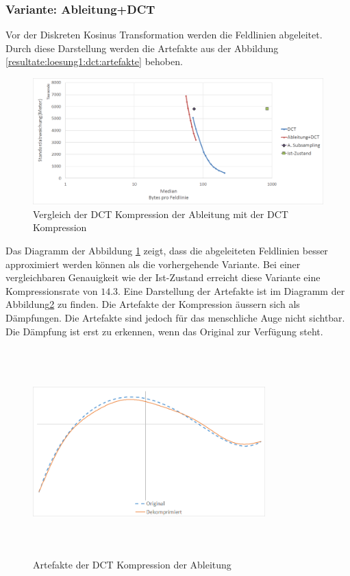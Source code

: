 \subsubsection{Variante: Ableitung+DCT}\label{resultate:dct:ableitung_dct}
Vor der Diskreten Kosinus Transformation werden die Feldlinien abgeleitet. Durch diese Darstellung werden die Artefakte aus der Abbildung \ref{resultate:loesung1:dct:artefakte} behoben.\\
\begin{figure}[!htbp]
	\center
	\includegraphics[width=1\textwidth,keepaspectratio]{./pictures/resultate/loesung1/loesung1-1/loesung1_1.png}
	\caption{Vergleich der DCT Kompression der Ableitung mit der DCT Kompression}
	\label{resultate:loesung1:dct_ableitung:resultate}
\end{figure}
Das Diagramm der Abbildung \ref{resultate:loesung1:dct_ableitung:resultate} zeigt, dass die abgeleiteten Feldlinien besser approximiert werden können als die vorhergehende Variante. Bei einer vergleichbaren Genauigkeit wie der Ist-Zustand erreicht diese Variante eine Kompressionsrate von $14.3$. Eine Darstellung der Artefakte ist im Diagramm der Abbildung\ref{resultate:loesung1:dct:byte:artefakte} zu finden. Die Artefakte der Kompression äussern sich als Dämpfungen. Die Artefakte sind jedoch für das menschliche Auge nicht sichtbar. Die Dämpfung ist erst zu erkennen, wenn das Original zur Verfügung steht.
\begin{figure}[!htbp]
	\center
	\includegraphics[width=0.8\textwidth,height=8cm,keepaspectratio]{./pictures/resultate/loesung1/loesung1-6/artefakte.png}
	\caption{Artefakte der DCT Kompression der Ableitung}
	\label{resultate:loesung1:dct:byte:artefakte}
\end{figure} 

